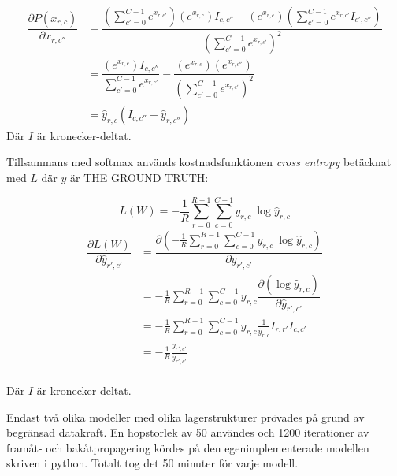 \documentclass[a4paper,11pt,twoside]{article}
\newcommand*{\pd}[2]{\ensuremath{\dfrac{\partial #1}{\partial #2}}}
\begin{document}
\begin{equation}
\begin{split}
\pd{P(x_{r,c})}{x_{r,c''}}
	& = \dfrac{(\sum^{C-1}_{c'=0}e^{x_{r,c'}}) (e^{x_{r,c}})I_{c,c''} - (e^{x_{r,c}})(\sum^{C-1}_{c'=0}e^{x_{r,c'}} I_{c',c''})}{(\sum^{C-1}_{c'=0}e^{x_{r,c'}})^2} \\
	& = \dfrac{(e^{x_{r,c}})I_{c,c''}}{\sum^{C-1}_{c'=0}e^{x_{r,c'}}} - \dfrac{(e^{x_{r,c}})(e^{x_{r,c''}})}{(\sum^{C-1}_{c'=0}e^{x_{r,c'}})^2} \\
	& = \hat{y}_{r,c}(I_{c,c''}-\hat{y}_{r,c''})
\end{split}
\end{equation}
Där $I$ är kronecker-deltat.

Tillsammans med softmax används kostnadsfunktionen \textit{cross entropy} betäcknat med $L$ där $y$ är THE GROUND TRUTH: \cite{cs231n} \cite{notesonbackprop}

\begin{equation}
L(W) = - \frac{1}{R}\sum^{R-1}_{r=0} \sum^{C-1}_{c=0}y_{r,c} \ \log{\hat{y}_{r,c}}
\end{equation}
\begin{equation}
\begin{split}
\pd{L(W)}{\hat{y}_{r',c'}} 
	& = \pd{\left(-\frac{1}{R}\sum^{R-1}_{r=0} \sum^{C-1}_{c=0}y_{r,c} \ \log{\hat{y}_{r,c}}\right)}{\hat{y}_{r',c'}} \\
	& = -\frac{1}{R}\sum^{R-1}_{r=0} \sum^{C-1}_{c=0}y_{r,c} \pd{\left(\log{\hat{y}_{r,c}}\right)}{\hat{y}_{r',c'}} \\
	& = - \frac{1}{R}\sum^{R-1}_{r=0} \sum^{C-1}_{c=0} y_{r,c} \frac{1}{\hat{y}_{r,c}} I_{r, r'} I_{c, c'}\\
	& = - \frac{1}{R} \frac{y_{r',c'}}{\hat{y}_{r',c'}} \\
\end{split}
\end{equation}

Där $I$ är kronecker-deltat.

Endast två olika modeller med olika lagerstrukturer prövades på grund av begränsad datakraft. En hopstorlek av 50 användes och 1200 iterationer av framåt- och bakåtpropagering kördes på den egenimplementerade modellen skriven i python. Totalt tog det 50 minuter för varje modell.
\end{document}

